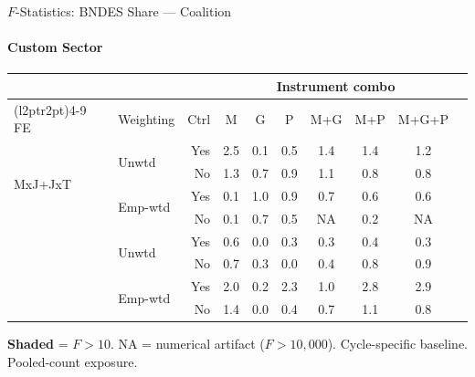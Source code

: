 \documentclass[aspectratio=169,10pt]{beamer}
\begin{document}
\begin{frame}[t]{$F$-Statistics: BNDES Share --- Coalition}
\framesubtitle{Custom Sector}
\begin{center}
\footnotesize
\setlength{\tabcolsep}{3.5pt}
\renewcommand{\arraystretch}{1.05}
\begin{tabular}{@{}llrccccccc@{}}
\toprule
 & & & \multicolumn{6}{c}{Instrument combo} \\
\cmidrule(l{2pt}r{2pt}){4-9}
FE & Weighting & Ctrl & M & G & P & M+G & M+P & M+G+P \\
\midrule
  \multirow{4}{*}{MxJ+JxT} & \multirow{2}{*}{Unwtd} & Yes & 2.5 & 0.1 & 0.5 & 1.4 & 1.4 & 1.2 \\
   &  & No & 1.3 & 0.7 & 0.9 & 1.1 & 0.8 & 0.8 \\
   & \multirow{2}{*}{Emp-wtd} & Yes & 0.1 & 1.0 & 0.9 & 0.7 & 0.6 & 0.6 \\
   &  & No & 0.1 & 0.7 & 0.5 & NA & 0.2 & NA \\
\addlinespace[5pt]
  \multirow{4}{*}{MxJ+MxT} & \multirow{2}{*}{Unwtd} & Yes & 0.6 & 0.0 & 0.3 & 0.3 & 0.4 & 0.3 \\
   &  & No & 0.7 & 0.3 & 0.0 & 0.4 & 0.8 & 0.9 \\
   & \multirow{2}{*}{Emp-wtd} & Yes & 2.0 & 0.2 & 2.3 & 1.0 & 2.8 & 2.9 \\
   &  & No & 1.4 & 0.0 & 0.4 & 0.7 & 1.1 & 0.8 \\
\bottomrule
\end{tabular}
\end{center}
{\scriptsize \colorbox{pass}{\textbf{Shaded}} = $F>10$. NA = numerical artifact ($F>10{,}000$). Cycle-specific baseline. Pooled-count exposure.}
\end{frame}
\end{document}
